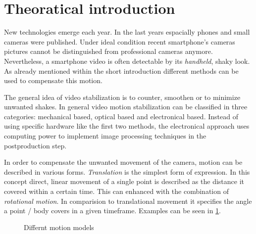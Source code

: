 \section{Theoratical introduction}\label{sec:thintro}
New technologies emerge each year. In the last years espacially phones and small cameras were published. Under ideal condition recent smartphone's cameras pictures cannot be distinguished from professional cameras anymore. Nevertheless, a smartphone video is often detectable by its \textit{handheld}, shaky look. As already mentioned within the short introduction different methods can be used to compensate this motion.

The general idea of video stabilization is to counter, smoothen or to minimize unwanted shakes. In general video motion stabilization can be classified in three categories: mechanical based, optical based and electronical based. Instead of using specific hardware like the first two methods, the electronical approach uses computing power to implement image processing techniques in the  postproduction step. \cite{blockTang}

In order to compensate the unwanted movement of the camera, motion can be described in various forms. \textit{Translation} is the simplest form of expression. In this concept direct, linear movement of a single point is described as the distance it covered within a certain time. This can enhanced with the combination of \textit{rotational motion}.  In comparision to translational movement it specifies the angle a point / body covers in a given timeframe. Examples can be seen in \cref{fig:motionmodels}.
\begin{figure}[h!]\centering
    \begin{minipage}{.45\textwidth}\centering
    \end{minipage}
    \begin{minipage}{.45\textwidth}\centering
    \end{minipage}
    \caption{Differnt motion models}
    \label{fig:motionmodels}
\end{figure}

